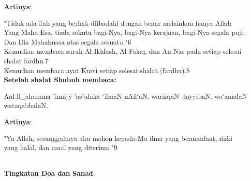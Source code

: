 \documentclass[a4paper,12pt]{article}
\begin{document}
\noindent
\textbf{Artinya}:
\par
\indent
"Tidak ada ilah yang berhak diibadahi dengan benar melainkan hanya Allah 
Yang Maha Esa, tiada sekutu bagi-Nya, bagi-Nya kerajaan, bagi-Nya segala 
puji. Dan Dia Mahakuasa atas segala sesuatu."{\scriptsize 6}\\
\indent
Kemudian membaca surah Al-Ikhlash, Al-Falaq, dan An-Nas pada setiap selesai 
shalat fardhu.{\scriptsize 7}\\
\indent
Kemudian membaca ayat Kursi setiap selesai shalat (fardhu).{\scriptsize 8}
\\
\noindent
\textbf{Setelah shalat Shubuh membaca:}
\begin{arabtext}
\noindent
Aal-ll_ahumma 'inni-y 'as'aluka `ilmaN nAfi`aN, warizqaN .tayyibaN, 
wa`amalaN wataqabbalaN.\\
\end{arabtext}
\noindent
\textbf{Artinya}:
\par
\indent
"Ya Allah, sesungguhnya aku mohon kepada-Mu ilmu yang bermanfaat, rizki 
yang halal, dan amal yang diterima."{\scriptsize 9}\\\\
\par
\noindent
\textbf{Tingkatan Doa dan Sanad}:
\end{document}
